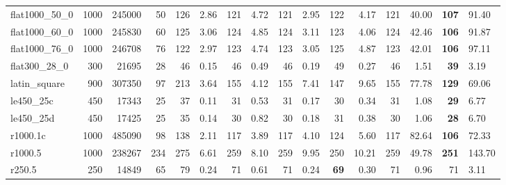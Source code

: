 \begin{table*}[tbh]
\begin{adjustbox}{width=\textwidth}
\begin{minipage}[b]{\textwidth}
\begin{tabular}{@{} lrrrrrrrrrrrrrr @{}}
flat1000\_50\_0 & 1000 & 245000 & 50 & 126 & 2.86 & 121 & 4.72 & 121 & 2.95 & 122 & 4.17 & 121 & 40.00 & \textbf{107} & 91.40 \\
flat1000\_60\_0 & 1000 & 245830 & 60 & 125 & 3.06 & 124 & 4.85 & 124 & 3.11 & 123 & 4.06 & 124 & 42.46 & \textbf{106} & 91.87 \\
flat1000\_76\_0 & 1000 & 246708 & 76 & 122 & 2.97 & 123 & 4.74 & 123 & 3.05 & 125 & 4.87 & 123 & 42.01 & \textbf{106} & 97.11 \\
flat300\_28\_0 & 300 & 21695 & 28 & 46 & 0.15 & 46 & 0.49 & 46 & 0.19 & 49 & 0.27 & 46 & 1.51 & \textbf{39} & 3.19 \\
latin\_square & 900 & 307350 & 97 & 213 & 3.64 & 155 & 4.12 & 155 & 7.41 & 147 & 9.65 & 155 & 77.78 & \textbf{129} & 69.06 \\
le450\_25c & 450 & 17343 & 25 & 37 & 0.11 & 31 & 0.53 & 31 & 0.17 & 30 & 0.34 & 31 & 1.08 & \textbf{29} & 6.77 \\
le450\_25d & 450 & 17425 & 25 & 35 & 0.14 & 30 & 0.82 & 30 & 0.18 & 31 & 0.38 & 30 & 1.06 & \textbf{28} & 6.70 \\
r1000.1c & 1000 & 485090 & 98 & 138 & 2.11 & 117 & 3.89 & 117 & 4.10 & 124 & 5.60 & 117 & 82.64 & \textbf{106} & 72.33 \\
r1000.5 & 1000 & 238267 & 234 & 275 & 6.61 & 259 & 8.10 & 259 & 9.95 & 250 & 10.21 & 259 & 49.78 & \textbf{251} & 143.70 \\
r250.5 & 250 & 14849 & 65 & 79 & 0.24 & 71 & 0.61 & 71 & 0.24 & \textbf{69} & 0.30 & 71 & 0.96 & 71 & 3.11 \\
\bottomrule
\end{tabular}
\end{minipage}
\end{adjustbox}
\end{table*}